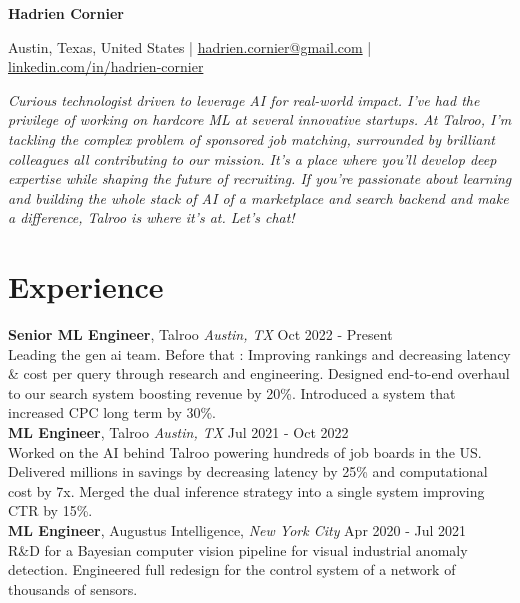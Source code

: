 \documentclass[a4paper,10pt]{article}
\begin{document}
\pagestyle{empty}

\centerline{\huge \textbf{Hadrien Cornier}}

\vspace{2mm}

\centerline{Austin, Texas, United States | \href{mailto:hadrien.cornier@gmail.com}{hadrien.cornier@gmail.com} | \href{https://linkedin.com/in/hadrien-cornier}{linkedin.com/in/hadrien-cornier}}

\vspace{4mm}

\noindent\textit{Curious technologist driven to leverage AI for real-world impact. I've had the privilege of working on hardcore ML at several innovative startups. At Talroo, I'm tackling the complex problem of sponsored job matching, surrounded by brilliant colleagues all contributing to our mission. It's a place where you'll develop deep expertise while shaping the future of recruiting. If you're passionate about learning and building the whole stack of AI of a marketplace and search backend and make a difference, Talroo is where it's at. Let's chat!}

\vspace{4mm}

\section*{Experience}

\noindent\textbf{Senior ML Engineer}, Talroo \textit{Austin, TX} \hfill Oct 2022 - Present\\
Leading the gen ai team. Before that : Improving rankings and decreasing latency \& cost per query through research and engineering. Designed end-to-end overhaul to our search system boosting revenue by 20\%. Introduced a system that increased CPC long term by 30\%.\\    

\noindent\textbf{ML Engineer}, Talroo \textit{Austin, TX} \hfill Jul 2021 - Oct 2022\\
    Worked on the AI behind Talroo powering hundreds of job boards in the US. Delivered millions in savings by decreasing latency by 25\% and computational cost by 7x. Merged the dual inference strategy into a single system improving CTR by 15\%.\\

    \noindent\textbf{ML Engineer}, Augustus Intelligence, \textit{New York City} \hfill Apr 2020 - Jul 2021\\
    R\&D for a Bayesian computer vision pipeline for visual industrial anomaly detection. Engineered full redesign for the control system of a network of thousands of sensors.\\
\end{document}
